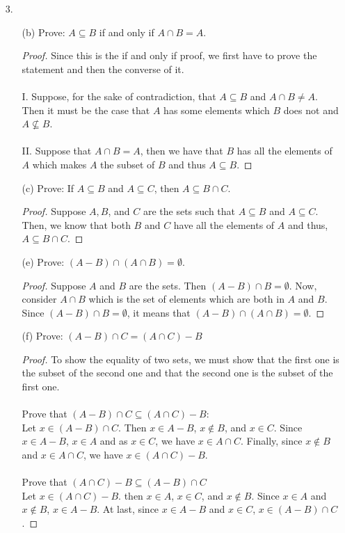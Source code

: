 \documentclass[12pt, a4paper]{article}                      %
\begin{document}
\begin{itemize}
\begin{itemize}
\item[3.]
\begin{itemize}
\item[(b)]
Prove: $A \subseteq B$ if and only if $A \cap B = A$.
\begin{proof}
Since this is the if and only if proof, we first have to prove the
statement and then the converse of it.\\\\
I. Suppose, for the sake of contradiction, that $A \subseteq B$ and
$A \cap B \neq A$. Then it must be the case that $A$ has some elements which
$B$ does not and $A \nsubseteq B$.\\\\
II. Suppose that $A \cap B = A$, then we have that $B$ has all the elements of $A$
which makes $A$ the subset of $B$ and thus $A \subseteq B$.
\end{proof}
\item[]
\item[(c)]
Prove: If $A \subseteq B$ and $A \subseteq C$, then $A \subseteq B \cap C$.
\begin{proof}
Suppose $A, B$, and $C$ are the sets such that $A \subseteq B$ and $A \subseteq C$.
Then, we know that both $B$ and $C$ have all the elements of $A$ and thus, $A \subseteq B \cap C$.
\end{proof}
\item[]
\item[(e)]
Prove: $(A - B) \cap (A \cap B) = \emptyset$.
\begin{proof}
Suppose $A$ and $B$ are the sets. Then $(A - B) \cap B = \emptyset$.
Now, consider $A \cap B$ which is the set of elements which are both in $A$ and $B$.
Since $(A - B) \cap B = \emptyset$, it means that $(A - B) \cap (A \cap B) = \emptyset$.
\end{proof}
\item[]
\item[(f)]
Prove: $(A - B) \cap C = (A \cap C) - B$
\begin{proof}
To show the equality of two sets, we must show that the first one is the subset
of the second one and that the second one is the subset of the first one.
\\\\
Prove that $(A - B) \cap C \subseteq (A \cap C) - B$:\\
Let $x \in (A - B) \cap C$. Then $x \in A - B$, $x \notin B$, and $x \in C$. Since $x \in A - B$,
$x \in A$ and as $x \in C$, we have $x \in A \cap C$. Finally, since $x \notin B$ and $x \in A \cap C$,
we have $x \in (A \cap C) - B$.
\\\\
Prove that $(A \cap C) - B \subseteq (A - B) \cap C$\\
Let $x \in (A \cap C) - B$. then $x \in A$, $x \in C$, and $x \notin B$.
Since $x \in A$ and $x \notin B$, $x \in A - B$. At last, since $x \in A - B$
and $x \in C$, $x \in (A - B) \cap C$.
\end{proof}
\end{itemize}


\end{itemize}
\end{itemize}
\end{document}
